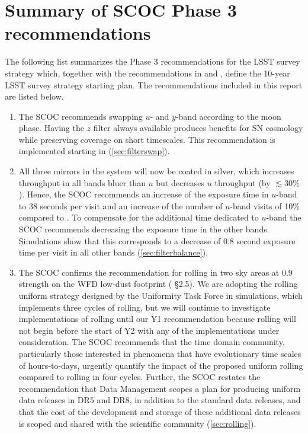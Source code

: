 \section{Summary of SCOC Phase 3 recommendations}\label{sec:summary}

The following list summarizes the Phase 3 recommendations for the LSST survey strategy which, together with the recommendations in  and , define the 10-year LSST survey strategy starting plan.   The recommendations included in this report are listed below.

\begin{enumerate}
\renewcommand{\labelenumi}{\roman{enumi}.} 

\item The SCOC recommends swapping $u$- and $y$-band according to the moon phase. Having the $z$ filter always available produces benefits for SN cosmology while preserving coverage on short timescales. This recommendation is implemented starting in  (\autoref{sec:filterswap}).

\item All three mirrors in the system will now be coated in silver, which increases throughput in all bands bluer than $u$ but decreases $u$ throughput (by $\lesssim30\%$). Hence, the SCOC recommends an increase of the exposure time in $u$-band to 38 seconds per visit and an increase of the number of $u$-band visits of 10\% compared to . To compensate for the additional time dedicated to $u$-band the SCOC recommends decreasing the exposure time in the other bands. Simulations show that this corresponds to a decrease of 0.8 second exposure time per visit in all other bands (\autoref{sec:filterbalance}).

\item {The SCOC confirms the recommendation for rolling in two sky areas at 0.9 strength on the WFD low-dust footprint ( \S2.5). We are adopting the rolling uniform strategy designed by the Uniformity Task Force in  simulations, which implements three cycles of rolling, but we will continue to investigate implementations of rolling until our Y1 recommendation because rolling will not begin before the start of Y2 with any of the implementations under consideration.  The SCOC recommends that the time domain community, particularly those interested in phenomena that have evolutionary time scales of hours-to-days, urgently quantify the impact of the proposed uniform rolling compared to rolling in four cycles. Further, the SCOC restates the recommendation that Data Management scopes a plan for producing uniform data releases in DR5 and DR8, in addition to the standard data releases, and that the cost of the development and storage of these additional data releases is scoped and shared with the scientific community (\autoref{sec:rolling}).} 


\end{enumerate}
